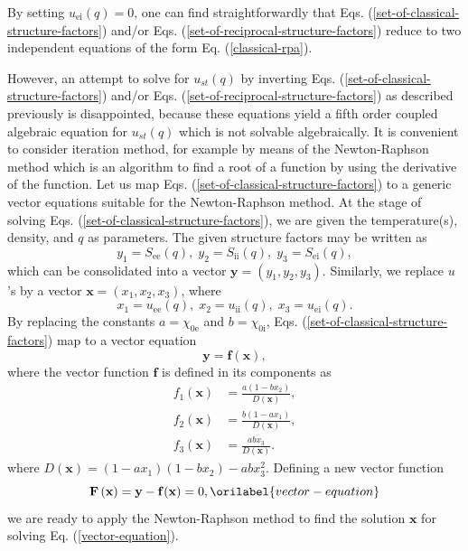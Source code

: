 \documentclass[aps,showkeys,noshowpacs,superscriptaddress,pre,preprint]{revtex4-2}
\let\label\orilabel
\begin{document}
By setting ${u_\mathrm{ei} (q)} = 0$,
one can find straightforwardly that Eqs. (\ref{set-of-classical-structure-factors}) and/or Eqs. (\ref{set-of-reciprocal-structure-factors}) 
reduce to two independent equations of the form Eq. (\ref{classical-rpa}).

However, an attempt to solve for $u_{st} (q)$ 
by inverting Eqs. (\ref{set-of-classical-structure-factors}) and/or Eqs. (\ref{set-of-reciprocal-structure-factors})
as described previously is disappointed, 
because these equations yield a fifth order coupled algebraic equation for $u_{st} (q)$ which is not solvable algebraically.
It is convenient to consider iteration method, for example by means of the Newton-Raphson method 
which is an algorithm to find a root of a function by using the derivative of the function.
Let us map Eqs. (\ref{set-of-classical-structure-factors}) to a generic vector equations
suitable for the Newton-Raphson method.
At the stage of solving Eqs. (\ref{set-of-classical-structure-factors}),
we are given the temperature(s), density, and $q$ as parameters.
The given structure factors may be written as
\begin{equation}
y_1 = {S_\mathrm{ee} (q)}, \; y_2 = {S_\mathrm{ii} (q)}, \; y_3 = {S_\mathrm{ei} (q) } ,
\end{equation}
which can be consolidated into a vector $\mathbf{y} = \left( y_1, y_2, y_3 \right)$.
Similarly, we replace $u$'s by a vector $\mathbf{x} = \left( x_1, x_2, x_3 \right)$, where
\begin{equation}
x_1 = {u_\mathrm{ee} (q)}, \; x_2 = {u_\mathrm{ii} (q)}, \; x_3 = {u_\mathrm{ei} (q)} .
\end{equation}
By replacing the constants $a = \chi_{0\mathrm{e}}$ and $b = \chi_{0\mathrm{i}}$,
Eqs. (\ref{set-of-classical-structure-factors}) map to a vector equation
\begin{equation}
\mathbf{y} = {\mathbf{f} ( \mathbf{x} ) } ,
\end{equation}
where the vector function $\mathbf{f}$ is defined in its components as
\begin{equation}
\begin{aligned}
{f_1 ( \mathbf{x} )} &= \frac{a \left( 1 - b x_2 \right)}{D ( \mathbf{x} )}, \\
{f_2 ( \mathbf{x} )} &= \frac{b \left( 1 - a x_1 \right)}{D ( \mathbf{x} )}, \\
{f_3 ( \mathbf{x} )} &= \frac{ab x_3}{D ( \mathbf{x} )}.
\end{aligned}
\end{equation}
where ${D ( \mathbf{x} )} = \left( 1 - a x_1 \right) \left( 1 - b x_2 \right) - a b x_3^2$.
Defining a new vector function
\begin{equation}
{\mathbf{F} \left( \mathbf{x} \right) } = \mathbf{y} - {\mathbf{f} ( \mathbf{x} ) } = 0 ,
\label{vector-equation}
\end{equation}
we are ready to apply the Newton-Raphson method to find the solution $\mathbf{x}$ 
for solving Eq. (\ref{vector-equation}).
\end{document}
